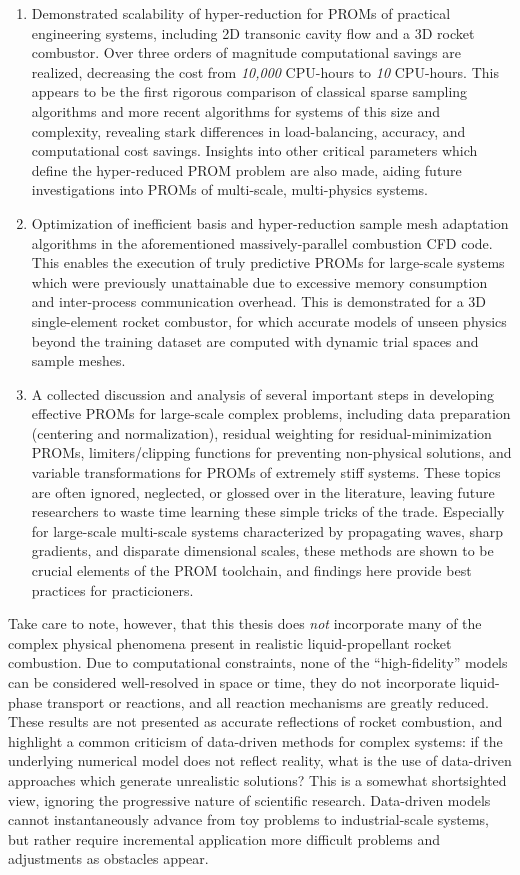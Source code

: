 \begin{enumerate}
    \item Demonstrated scalability of hyper-reduction for PROMs of practical engineering systems, including 2D transonic cavity flow and a 3D rocket combustor. Over three orders of magnitude computational savings are realized, decreasing the cost from {\em 10,000} CPU-hours to {\em 10} CPU-hours. This appears to be the first rigorous comparison of classical sparse sampling algorithms and more recent algorithms for systems of this size and complexity, revealing stark differences in load-balancing, accuracy, and computational cost savings. Insights into other critical parameters which define the hyper-reduced PROM problem are also made, aiding future investigations into PROMs of multi-scale, multi-physics systems.
    \item Optimization of inefficient basis and hyper-reduction sample mesh adaptation algorithms in the aforementioned massively-parallel combustion CFD code. This enables the execution of truly predictive PROMs for large-scale systems which were previously unattainable due to excessive memory consumption and inter-process communication overhead. This is demonstrated for a 3D single-element rocket combustor, for which accurate models of unseen physics beyond the training dataset are computed with dynamic trial spaces and sample meshes.
    \item A collected discussion and analysis of several important steps in developing effective PROMs for large-scale complex problems, including data preparation (centering and normalization), residual weighting for residual-minimization PROMs, limiters/clipping functions for preventing non-physical solutions, and variable transformations for PROMs of extremely stiff systems. These topics are often ignored, neglected, or glossed over in the literature, leaving future researchers to waste time learning these simple tricks of the trade. Especially for large-scale multi-scale systems characterized by propagating waves, sharp gradients, and disparate dimensional scales, these methods are shown to be crucial elements of the PROM toolchain, and findings here provide best practices for practicioners. 
\end{enumerate}

Take care to note, however, that this thesis does \textit{not} incorporate many of the complex physical phenomena present in realistic liquid-propellant rocket combustion. Due to computational constraints, none of the ``high-fidelity'' models can be considered well-resolved in space or time, they do not incorporate liquid-phase transport or reactions, and all reaction mechanisms are greatly reduced. These results are not presented as accurate reflections of rocket combustion, and highlight a common criticism of data-driven methods for complex systems: if the underlying numerical model does not reflect reality, what is the use of data-driven approaches which generate unrealistic solutions? This is a somewhat shortsighted view, ignoring the progressive nature of scientific research. Data-driven models cannot instantaneously advance from toy problems to industrial-scale systems, but rather require incremental application more difficult problems and adjustments as obstacles appear. 

